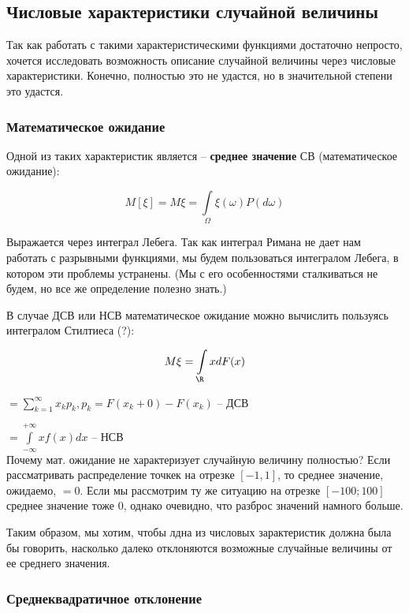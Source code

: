 \documentclass{article}
\begin{document}
\subsection{Числовые характеристики случайной величины}

Так как работать с такими характеристическими функциями достаточно непросто, хочется исследовать возможность описание случайной величины через числовые характеристики. Конечно, полностью это не удастся, но в значительной степени это удастся.

\subsubsection{Математическое ожидание}

Одной из таких характеристик является -- \textbf{среднее значение} СВ (математическое ожидание):

$$M[\xi] = M\xi = \int\limits_{\Omega}\xi(\omega)P(d\omega)$$

Выражается через интеграл Лебега. Так как интеграл Римана не дает нам работать с разрывными функциями, мы будем пользоваться интегралом Лебега, в котором эти проблемы устранены. (Мы с его особенностями сталкиваться не будем, но все же определение полезно знать.)

В случае ДСВ или НСВ математическое ожидание можно вычислить пользуясь интегралом Стилтиеса (?):

$$M\xi = \int\limits_{\R}xdF(x)$$

\qquad$= \sum\limits_{k = 1}^{\infty}x_k p_k, p_k = F(x_k + 0) - F(x_k)$ -- ДСВ

\qquad$= \int\limits_{-\infty}^{+\infty}xf(x)dx$ -- НСВ
\\

Почему мат. ожидание не характеризует случайную величину полностью? Если рассматривать распределение точкек на отрезке $[-1, 1]$, то среднее значение, ожидаемо, $= 0$. Если мы рассмотрим ту же ситуацию на отрезке $[-100; 100]$ среднее значение тоже $0$, однако очевидно, что разброс значений намного больше.

Таким образом, мы хотим, чтобы лдна из числовых зарактеристик должна была бы говорить, насколько далеко отклоняются возможные случайные величины от ее среднего значения.

\subsubsection{Среднеквадратичное отклонение}
\end{document}
